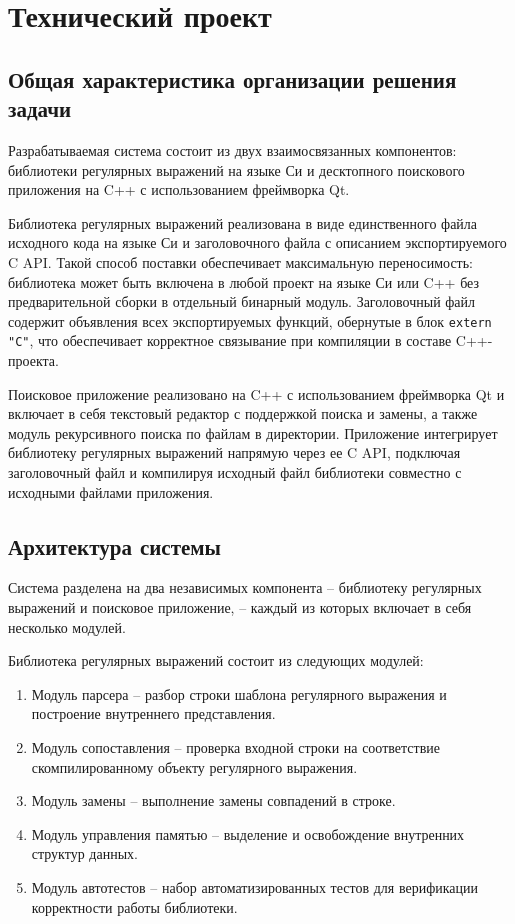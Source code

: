 \section{Технический проект}

\subsection{Общая характеристика организации решения задачи}

Разрабатываемая система состоит из двух взаимосвязанных компонентов: библиотеки регулярных выражений на языке Си и десктопного поискового приложения на C++ с использованием фреймворка Qt.

Библиотека регулярных выражений реализована в виде единственного файла исходного кода на языке Си и заголовочного файла с описанием экспортируемого C API. Такой способ поставки обеспечивает максимальную переносимость: библиотека может быть включена в любой проект на языке Си или C++ без предварительной сборки в отдельный бинарный модуль. Заголовочный файл содержит объявления всех экспортируемых функций, обернутые в блок \verb`extern "C"`, что обеспечивает корректное связывание при компиляции в составе C++-проекта.

Поисковое приложение реализовано на C++ с использованием фреймворка Qt и включает в себя текстовый редактор с поддержкой поиска и замены, а также модуль рекурсивного поиска по файлам в директории. Приложение интегрирует библиотеку регулярных выражений напрямую через ее C API, подключая заголовочный файл и компилируя исходный файл библиотеки совместно с исходными файлами приложения.

\subsection{Архитектура системы}

Система разделена на два независимых компонента -- библиотеку регулярных выражений и поисковое приложение, -- каждый из которых включает в себя несколько модулей.

Библиотека регулярных выражений состоит из следующих модулей:
\begin{enumerate}
	\item Модуль парсера -- разбор строки шаблона регулярного выражения
	и построение внутреннего представления.
	\item Модуль сопоставления -- проверка входной строки на соответствие
	скомпилированному объекту регулярного выражения.
	\item Модуль замены -- выполнение замены совпадений в строке.
	\item Модуль управления памятью -- выделение и освобождение
	внутренних структур данных.
	\item Модуль автотестов -- набор автоматизированных тестов
	для верификации корректности работы библиотеки.
\end{enumerate}

